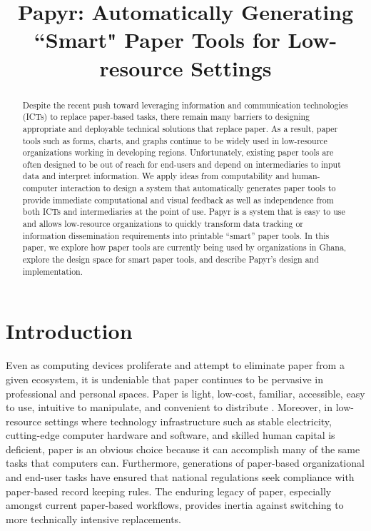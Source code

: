 \documentclass{sig-alternate}
\begin{document}
\newcommand{\nifty}{\textsf{Papyr}\xspace}

\title{Papyr: Automatically Generating ``Smart" Paper Tools for Low-resource Settings}
\author{}
\maketitle

\begin{abstract}

Despite the recent push toward leveraging information and communication technologies (ICTs) to replace paper-based tasks, there remain many barriers to designing appropriate and deployable technical solutions that replace paper.
As a result, paper tools such as forms, charts, and graphs continue to be widely used in low-resource organizations working in developing regions.
Unfortunately, existing paper tools are often designed to be out of reach for end-users and depend on intermediaries to input data and interpret information. 
We apply ideas from computability and human-computer interaction to design a system that automatically generates paper tools to provide immediate computational and visual feedback as well as independence from both ICTs and intermediaries at the point of use. 
\nifty is a system that is easy to use and allows low-resource organizations to quickly transform data tracking or information dissemination requirements into printable ``smart'' paper tools. 
In this paper, we explore how paper tools are currently being used by organizations in Ghana, explore the design space for smart paper tools, and describe \nifty's design and implementation.

\end{abstract}



\section{Introduction}


Even as computing devices proliferate and attempt to eliminate paper from a given ecosystem, it is undeniable that paper continues to be pervasive in professional and personal spaces.
Paper is light, low-cost, familiar, accessible, easy to use, intuitive to manipulate, and convenient to distribute \cite{sellen1997,sellen2002,johnson1993}. Moreover, in low-resource settings where technology infrastructure such as stable electricity, cutting-edge computer hardware and software, and skilled human capital is deficient, paper is an obvious choice because it can accomplish many of the same tasks that computers can. Furthermore, generations of paper-based organizational and end-user tasks have ensured that national regulations seek compliance with paper-based record keeping rules. The enduring legacy of paper, especially amongst current paper-based workflows, provides inertia against switching to more technically intensive replacements. 
\end{document}
